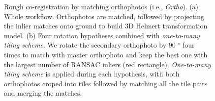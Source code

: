 \begin{figure}[htbp]
    \begin{center}
        \caption{Rough co-registration by matching orthophotos (i.e., \textit{Ortho}). (a) Whole workflow. Orthophotos are matched, followed by projecting the inlier matches onto ground to build 3D Helmert transformation model. (b) Four rotation hypotheses combined with \textit{one-to-many tiling scheme}. We rotate the secondary orthophoto by 90 $^\circ$ four times to match with master orthophoto and keep the best one with the largest number of RANSAC inliers (red rectangle). \textit{One-to-many tiling scheme} is applied during each hypothesis, with both orthophotos croped into tiles followed by matching all the tile pairs and merging the matches.}
        \label{WorkflowOrtho}
    \end{center}
\end{figure}

